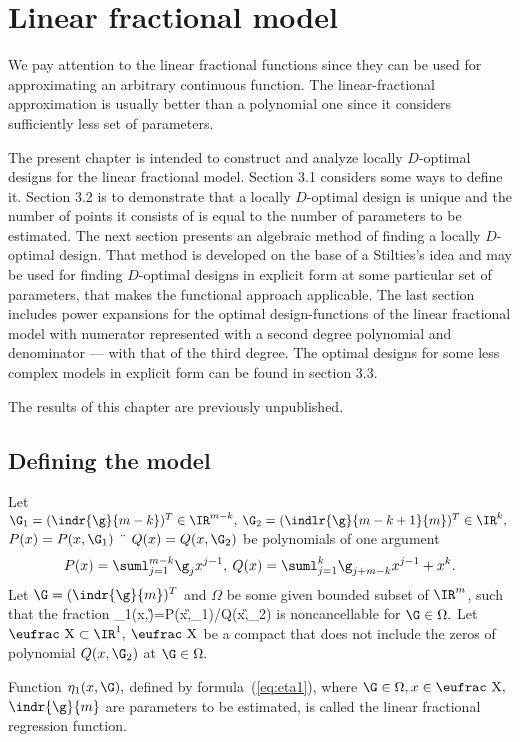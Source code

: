 
\newpage

\chapter{\bf Linear fractional model}

We pay attention to the linear fractional functions since they can be used
for approximating an arbitrary continuous function. The linear-fractional
approximation is usually better than a polynomial one since it considers
sufficiently less set of parameters.

The present chapter is intended to construct and analyze locally $D$-optimal
designs for the linear fractional model. Section 3.1 considers some ways to
define it. Section 3.2 is to demonstrate that a locally $D$-optimal design
is unique and the number of points it consists of is equal to the number of
parameters to be estimated. The next section presents an algebraic method
of finding a locally $D$-optimal design. That method is developed on the
base of a Stilties's idea and may be used for finding $D$-optimal designs
in explicit form at some particular set of parameters, that makes the
functional approach applicable. The last section includes power expansions
for the optimal design-functions of the linear fractional model with
numerator represented with a second degree polynomial and denominator --- with
that of the third degree. The optimal designs for some less complex models
in explicit form can be found in section 3.3.

The results of this chapter are previously unpublished.


\section{Defining the model}

Let $\G_1=(\indr{\g}{m-k})^T\in\IR^{m-k},\>
 \G_2=(\indlr{\g}{m-k+1}{m})^T\in\IR^{k},\>$
$P(x)=P(x,\G_1)$ ¨ $Q(x)=Q(x,\G_2)$ be polynomials of one argument
$$
 P(x)=\suml_{j=1}^{m-k} \g_jx^{j-1},\>
 Q(x)=\suml_{j=1}^{k} \g_{j+m-k}x^{j-1}+x^k.
$$
Let $\G=(\indr{\g}{m})^T$ and
$\Omega$ be some given bounded subset of $\IR^m$, such that
the fraction
\beq
 \eta_1(x,\G)=P(x,\G_1)/Q(x,\G_2)
 \label{eq:eta1}
\eeq
is noncancellable for $\G\in\Omega.$
Let ${\mbox{\eufrac X}}\subset\IR^1,\>{\mbox{\eufrac X}}$ be a compact
that does not include the zeros of polynomial $Q(x,\G_2)$ at $\G\in\Omega.$

Function $\eta_1(x,\G),$ defined by formula~(\ref{eq:eta1}),
where $\G\in\Omega,x\in{\mbox{\eufrac X}},\>$
$\indr{\g}{m}$ are parameters to be estimated, is called the linear
fractional regression function.

